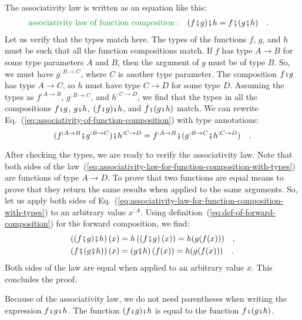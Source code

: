 The associativity law is written as an equation like this:
\begin{align}
{\color{greenunder}\text{associativity law of function composition}:}\quad & (f\bef g)\bef h=f\bef(g\bef h)\quad.\label{eq:associativity-of-function-composition}
\end{align}
Let us verify that the types match here. The types of the functions
$f$, $g$, and $h$ must be such that all the function compositions
match. If $f$ has type $A\rightarrow B$ for some type parameters
$A$ and $B$, then the argument of $g$ must be of type $B$. So,
we must have $g^{:B\rightarrow C}$, where $C$ is another type parameter.
The composition $f\bef g$ has type $A\rightarrow C$, so $h$ must
have type $C\rightarrow D$ for some type $D$. Assuming the types
as $f^{:A\rightarrow B}$, $g^{:B\rightarrow C}$, and $h^{:C\rightarrow D}$,
we find that the types in all the compositions $f\bef g$, $g\bef h$,
$(f\bef g)\bef h$, and $f\bef(g\bef h)$ match. We can rewrite Eq.~(\ref{eq:associativity-of-function-composition})
with type annotations: 
\begin{equation}
(f^{:A\rightarrow B}\bef g^{:B\rightarrow C})\bef h^{:C\rightarrow D}=f^{:A\rightarrow B}\bef(g^{:B\rightarrow C}\bef h^{:C\rightarrow D})\quad.\label{eq:associativity-law-for-function-composition-with-types}
\end{equation}

After checking the types, we are ready to verify the associativity
law. Note that both sides of the law~(\ref{eq:associativity-law-for-function-composition-with-types})
are functions of type $A\rightarrow D$. To prove that two functions
are equal means to prove that they return the same results when applied
to the same arguments. So, let us apply both sides of Eq.~(\ref{eq:associativity-law-for-function-composition-with-types})
to an arbitrary value $x^{:A}$. Using definition~(\ref{eq:def-of-forward-composition})
for the forward composition, we find:
\begin{align*}
\left((f\bef g)\bef h\right)(x) & =h\left(\left(f\bef g\right)(x)\right)=h(g(f(x)))\quad,\\
\left(f\bef(g\bef h)\right)(x) & =\left(g\bef h\right)(f(x))=h(g(f(x)))\quad.
\end{align*}
Both sides of the law are equal when applied to an arbitrary value
$x$. This concludes the proof.

Because of the associativity law, we do not need parentheses when
writing the expression $f\bef g\bef h$. The function $(f\bef g)\bef h$
is equal to the function $f\bef(g\bef h)$.


